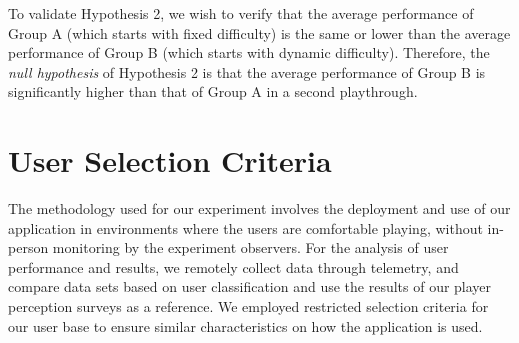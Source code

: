 To validate Hypothesis 2, we wish to verify that the average performance of Group A (which starts with fixed difficulty) is the same or lower than the average performance of Group B (which starts with dynamic difficulty). Therefore, the \emph{null hypothesis} of Hypothesis 2 is that the average performance of Group B is significantly higher than that of Group A in a second playthrough.





\section{User Selection Criteria}
\label{sec:user-selection-criteria}


The methodology used for our experiment involves the deployment and use of our application in environments where the users are comfortable playing, without in-person monitoring by the experiment observers. For the analysis of user performance and results, we remotely collect data through telemetry, and compare data sets based on user classification and use the results of our player perception surveys as a reference. We employed restricted selection criteria for our user base to ensure similar characteristics on how the application is used.


